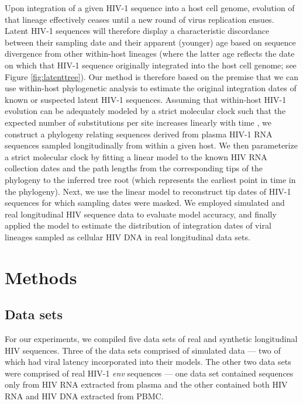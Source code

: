 \documentclass[12pt]{article}
\begin{document}
Upon integration of a given HIV-1 sequence into a host cell genome, evolution of that lineage effectively ceases until a new round of virus replication ensues.
Latent HIV-1 sequences will therefore display a characteristic discordance between their sampling date and their apparent (younger) age based on sequence divergence from other within-host lineages (where the latter age reflects the date on which that HIV-1 sequence originally integrated into the host cell genome; see Figure \ref{fig:latenttree}).
Our method is therefore based on the premise that we can use within-host phylogenetic analysis to estimate the original integration dates of known or suspected latent HIV-1 sequences.
Assuming that within-host HIV-1 evolution can be adequately modeled by a strict molecular clock such that the expected number of substitutions per site increases linearly with time \citep{Ho14}, we construct a phylogeny relating sequences derived from plasma HIV-1 RNA sequences sampled longitudinally from within a given host. We then parameterize a strict molecular clock by fitting a linear model to the known HIV RNA collection dates and the path lengths from the corresponding tips of the phylogeny to the inferred tree root (which represents the earliest point in time in the phylogeny).
Next, we use the linear model to reconstruct tip dates of HIV-1 sequences for which sampling dates were masked. 
We employed simulated and real longitudinal HIV sequence data to evaluate model accuracy, and finally applied the model to estimate the distribution of integration dates of viral lineages sampled as cellular HIV DNA in real longitudinal data sets.


\section * {Methods} \label{sec:methods}

\subsection * {Data sets}
For our experiments, we compiled five data sets of real and synthetic longitudinal HIV sequences.
Three of the data sets comprised of simulated data --- two of which had viral latency incorporated into their models.
The other two data sets were comprised of real HIV-1 \emph{env} sequences --- one data set contained sequences only from HIV RNA extracted from plasma and the other contained both HIV RNA and HIV DNA extracted from PBMC.
\end{document}
